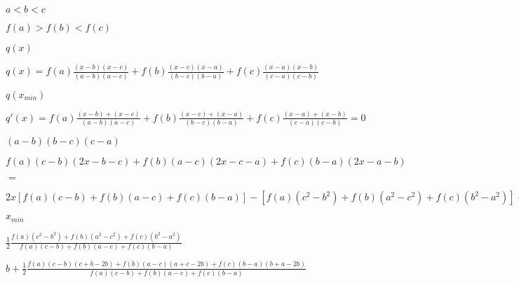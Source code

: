 \documentclass{article}
\def\lthtmlcheckvsize{\ifdim\ht\sizebox<\vsize 
  \ifdim\wd\sizebox<\hsize\expandafter\hfill\fi \expandafter\vfill
  \else\expandafter\vss\fi}%
\begin{document}
{\newpage\clearpage
{}%
$ a<b<c$%
\lthtmlindisplaymathZ
\lthtmlcheckvsize\clearpage}

{\newpage\clearpage
{}%
$ f(a)>f(b)<f(c)$%
\lthtmlindisplaymathZ
\lthtmlcheckvsize\clearpage}

{\newpage\clearpage
{}%
$ q(x)$%
\lthtmlindisplaymathZ
\lthtmlcheckvsize\clearpage}

{\newpage\clearpage
{}%
$\displaystyle q(x)=f(a)\frac{(x-b)(x-c)}{(a-b)(a-c)}+f(b)\frac{(x-c)(x-a)}{(b-c)(b-a)}
+f(c)\frac{(x-a)(x-b)}{(c-a)(c-b)}$%
\lthtmlindisplaymathZ
\lthtmlcheckvsize\clearpage}

{\newpage\clearpage
{}%
$ q(x_{min})$%
\lthtmlindisplaymathZ
\lthtmlcheckvsize\clearpage}

{\newpage\clearpage
{}%
$\displaystyle q'(x)=f(a)\frac{(x-b)+(x-c)}{(a-b)(a-c)}+f(b)\frac{(x-c)+(x-a)}{(b-c)(b-a)}
+f(c)\frac{(x-a)+(x-b)}{(c-a)(c-b)}=0$%
\lthtmlindisplaymathZ
\lthtmlcheckvsize\clearpage}

{\newpage\clearpage
{}%
$ (a-b)(b-c)(c-a)$%
\lthtmlindisplaymathZ
\lthtmlcheckvsize\clearpage}

{\newpage\clearpage
{}%
$\displaystyle f(a)(c-b)(2x-b-c)+f(b)(a-c)(2x-c-a)+f(c)(b-a)(2x-a-b)$%
\lthtmlindisplaymathZ
\lthtmlcheckvsize\clearpage}

{\newpage\clearpage
{}%
$\displaystyle =$%
\lthtmlindisplaymathZ
\lthtmlcheckvsize\clearpage}

{\newpage\clearpage
{}%
$\displaystyle 2x[f(a)(c-b)+f(b)(a-c)+f(c)(b-a)]
-[f(a)(c^2-b^2)+f(b)(a^2-c^2)+f(c)(b^2-a^2)]=0$%
\lthtmlindisplaymathZ
\lthtmlcheckvsize\clearpage}

{\newpage\clearpage
{}%
$\displaystyle x_{min}$%
\lthtmlindisplaymathZ
\lthtmlcheckvsize\clearpage}

{\newpage\clearpage
{}%
$\displaystyle \frac{1}{2}\frac{f(a)(c^2-b^2)+f(b)(a^2-c^2)+f(c)(b^2-a^2)}{f(a)(c-b)+f(b)(a-c)+f(c)(b-a)}$%
\lthtmlindisplaymathZ
\lthtmlcheckvsize\clearpage}

{\newpage\clearpage
{}%
$\displaystyle b+\frac{1}{2}\frac{f(a)(c-b)(c+b-2b)+f(b)(a-c)(a+c-2b)+f(c)(b-a)(b+a-2b)}{f(a)(c-b)+f(b)(a-c)+f(c)(b-a)}$%
\lthtmlindisplaymathZ
\lthtmlcheckvsize\clearpage}
\end{document}
